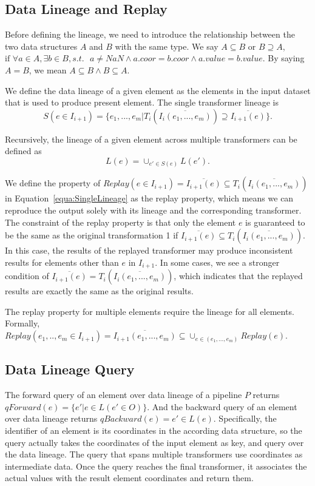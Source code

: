 \documentclass{sig-alternate}
\begin{document}
\subsection{Data Lineage and Replay}
Before defining the lineage, we need to introduce the relationship between the two data structures $A$ and $B$ with the same type.
We say $A \subseteq B \text{ or } B \supseteq A$, $\text{if }\forall a \in A, \exists b \in B, s.t.\text{ } a \neq NaN \land a.coor = b.coor \land a.value = b.value$.
By saying $A = B$, we mean $A \subseteq B \land B \subseteq A$.

We define the data lineage of a given element as the elements in the input dataset that is used to produce present element.
The single transformer lineage is
\begin{equation}
S(e \in I_{i+1}) = \{e_1, ..., e_m | T_i(\overline{I_i(e_1, ..., e_m)}) \supseteq \overline{I_{i+1}(e)}\}.
\label{equa:SingleLineage}
\end{equation}


Recursively, the lineage of a given element across multiple transformers can be defined as
\begin{equation}
L(e) = \cup_{e' \in S(e)} L(e').
\end{equation}

We define the property of $Replay(e \in I_{i+1}) = \overline{I_{i+1}(e)} \subseteq T_i(\overline{I_i(e_1, ..., e_m)})$ in Equation~\ref{equa:SingleLineage}
as the replay property, which means we can reproduce the output solely with its lineage and the corresponding transformer.
The constraint of the replay property is that only the element $e$ is guaranteed to be the same as the original transformation 1
if $\overline{I_{i+1}(e)} \subseteq T_i(\overline{I_i(e_1, ..., e_m)})$. In this case, the results of the replayed transformer may
produce inconsistent results for elements other than $e$ in $I_{i+1}$. 
In some cases, we see a stronger condition of $\overline{I_{i+1}(e)} = T_i(\overline{I_i(e_1, ..., e_m)})$, which indicates that
the replayed results are exactly the same as the original results.

The replay property for multiple elements require the lineage for all elements. Formally,
$Replay(e_1,..,e_m \in I_{i+1}) = \overline{I_{i+1}(e_1,...,e_m)} \subseteq \cup_{e \in (e_1,...,e_m)} Replay(e) $.

\subsection{Data Lineage Query}
The forward query of an element over data lineage of a pipeline $P$ returns $qForward(e) = \{e' | e \in L(e' \in O)\}$. 
And the backward query of an element over data lineage returns $qBackward(e) = e' \in L(e)$.
Specifically, the identifier of an element is its coordinates in the according data structure, so the query actually takes
the coordinates of the input element as key, and query over the data lineage. The query that spans multiple transformers 
use coordinates as intermediate data. Once the query reaches the final transformer, it associates the actual values
with the result element coordinates and return them.
\end{document}

